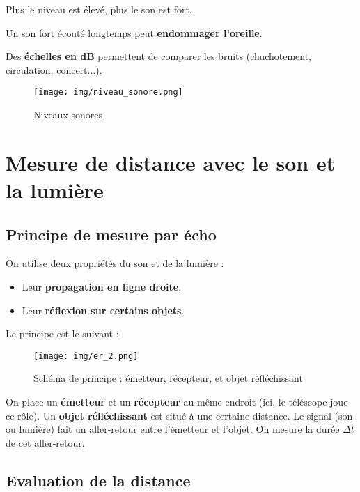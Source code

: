\documentclass[a4paper,12pt]{article}
\begin{document}
\begin{compactitem}
  \item Plus le niveau est élevé, plus le son est fort.
  \item Un son fort écouté longtemps peut \textbf{endommager l’oreille}.
  \item Des \textbf{échelles en dB} permettent de comparer les bruits (chuchotement, circulation, concert...).
\end{compactitem}

\begin{figure}[H]
  \centering
  \texttt{[image: img/niveau\_sonore.png]}
  \captionsetup{labelformat=empty}
  \caption{\label{} Niveaux sonores}
\end{figure}

\section*{Mesure de distance avec le son et la lumière}

\subsection*{Principe de mesure par écho}

On utilise deux propriétés du son et de la lumière :
\begin{itemize}
  \item Leur \textbf{propagation en ligne droite},
  \item Leur \textbf{réflexion sur certains objets}.
\end{itemize}

Le principe est le suivant :

\begin{figure}[H]
  \centering
  \texttt{[image: img/er\_2.png]}
  \captionsetup{labelformat=empty}
  \caption{\label{} Schéma de principe : émetteur, récepteur, et objet réfléchissant}
\end{figure}

On place un \textbf{émetteur} et un \textbf{récepteur} au même endroit (ici, le téléscope joue ce rôle). Un \textbf{objet réfléchissant} est situé à une certaine distance. Le signal (son ou lumière) fait un aller-retour entre l’émetteur et l’objet. On mesure la durée $\Delta t$ de cet aller-retour.

\subsection*{Evaluation de la distance}
\end{document}
